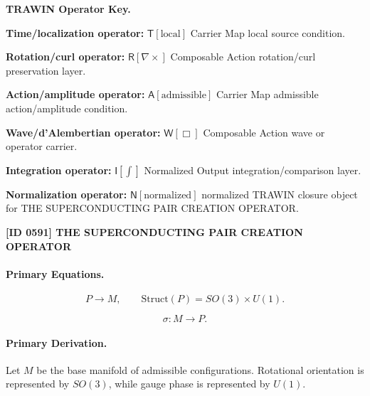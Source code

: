 \par\vspace{0.45\baselineskip}
\noindent\begin{minipage}[t]{\linewidth}
\begingroup
\small
\raggedright
\textbf{TRAWIN Operator Key.}\par
\noindent\textbf{Time/localization operator:} $\mathsf{T}\!\left[\mathrm{local}\right]$ Carrier Map local source condition.\par
\noindent\textbf{Rotation/curl operator:} $\mathsf{R}\!\left[\nabla\times\right]$ Composable Action rotation/curl preservation layer.\par
\noindent\textbf{Action/amplitude operator:} $\mathsf{A}\!\left[\mathrm{admissible}\right]$ Carrier Map admissible action/amplitude condition.\par
\noindent\textbf{Wave/d'Alembertian operator:} $\mathsf{W}\!\left[\Box\right]$ Composable Action wave or operator carrier.\par
\noindent\textbf{Integration operator:} $\mathsf{I}\!\left[\int\right]$ Normalized Output integration/comparison layer.\par
\noindent\textbf{Normalization operator:} $\mathsf{N}\!\left[\mathrm{normalized}\right]$ normalized TRAWIN closure object for THE SUPERCONDUCTING PAIR CREATION OPERATOR.\par
\endgroup
\end{minipage}

\clearpage
\noindent\textbf{[ID 0591] THE SUPERCONDUCTING PAIR CREATION OPERATOR}\par
\vspace{0.35em}
\paragraph{Primary Equations.}
\begin{equation}
P \longrightarrow M,
\qquad
\mathrm{Struct}(P)=SO(3)\times U(1).
\end{equation}

\begin{equation}
\sigma:M\longrightarrow P.
\end{equation}

\paragraph{Primary Derivation.}
Let $M$ be the base manifold of admissible configurations. Rotational orientation is represented by $SO(3)$, while gauge phase is represented by $U(1)$.

